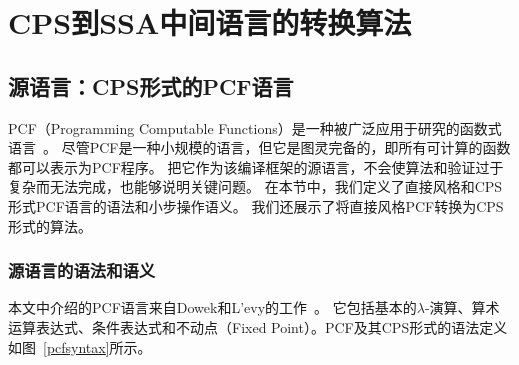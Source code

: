 
\chapter{CPS到SSA中间语言的转换算法} \label{ch:trans}

\section{源语言：CPS形式的PCF语言} \label{sec:cps}

PCF（Programming Computable Functions）是一种被广泛应用于研究的函数式语言~\cite{plotkin1977lcf}。
尽管PCF是一种小规模的语言，但它是图灵完备的，即所有可计算的函数都可以表示为PCF程序。
把它作为该编译框架的源语言，不会使算法和验证过于复杂而无法完成，也能够说明关键问题。
在本节中，我们定义了直接风格和CPS形式PCF语言的语法和小步操作语义。
我们还展示了将直接风格PCF转换为CPS形式的算法。

\subsection{源语言的语法和语义}

本文中介绍的PCF语言来自Dowek和L{'e}vy的工作~\cite{dowek2010introduction}。
它包括基本的$\lambda$-演算、算术运算表达式、条件表达式和不动点（Fixed Point）。PCF及其CPS形式的语法定义如图~\ref{pcfsyntax}所示。

